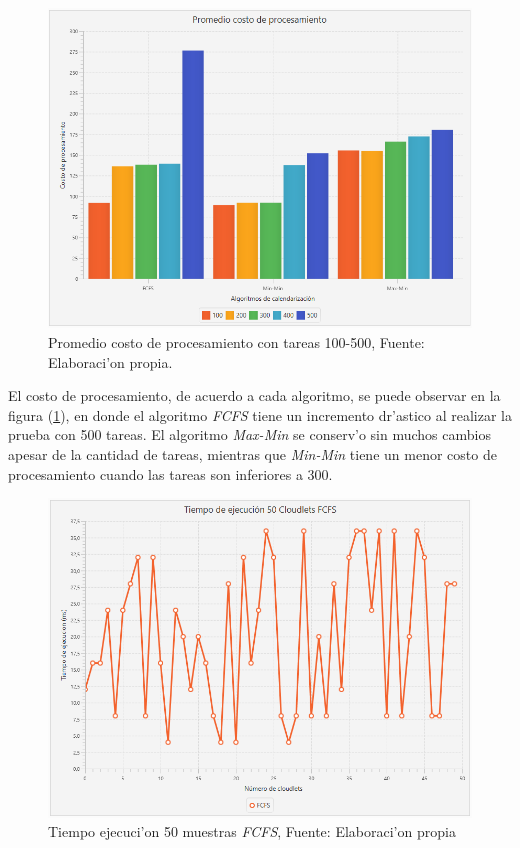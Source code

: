 \newpage
\setcounter{figure}{15}
\renewcommand\thefigure{\arabic{figure}}
\begin{figure}[h!] 
	\centering
	\includegraphics[scale=0.5]{media/costoproce}
	\caption{Promedio costo de procesamiento con tareas 100-500, Fuente: Elaboraci'on propia.}
	\label{fig:costo}
\end{figure}


El costo de procesamiento, de acuerdo a cada algoritmo, se puede observar en la figura (\ref{fig:costo}), en donde el algoritmo \textit{FCFS} tiene un incremento dr'astico al realizar la prueba con 500 tareas. El algoritmo \textit{Max-Min} se conserv'o sin muchos cambios apesar de la cantidad de tareas, mientras que \textit{Min-Min} tiene un menor costo de procesamiento cuando las tareas son inferiores a 300.

\newpage

\setcounter{figure}{16}
\renewcommand\thefigure{\arabic{figure}}
\begin{figure}[h!] 
	\centering
	\includegraphics[scale=0.5]{media/fcfs}
	\caption{Tiempo ejecuci'on 50 muestras \textit{FCFS}, Fuente: Elaboraci'on propia}
	\label{fig:ejecucion}
\end{figure}


